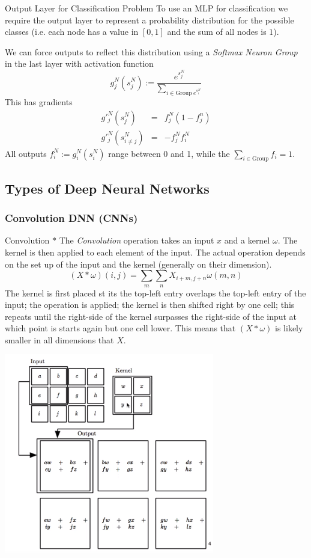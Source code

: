 \documentclass[11pt,a4paper]{article}
\begin{document}
  \begin{proposition}{Output Layer for Classification Problem}
    To use an MLP for classification we require the output layer to represent a probability distribution for the possible classes (i.e. each node has a value in $[0,1]$ and the sum of all nodes is $1$).
    \par We can force outputs to reflect this distribution using a \textit{Softmax Neuron Group} in the last layer with activation function
    \[ g_j^N(s_j^N):=\frac{e^{s_j^N}}{\sum_{i\in\text{Group}\ e^{s_i^N}}} \]
    This has gradients
    \[\begin{array}{rcl}
      g'_j^N(s_j^N)&=&f_j^N(1-f_j^n)\\
      g'_j^N(s_{i\neq j}^N)&=&-f_j^Nf_i^N
    \end{array}\]
    All outputs $f_i^N:=g_i^N(s_i^N)$ range between 0 and 1, while the $\sum_{i\in\text{Group}}f_i=1$.
  \end{proposition}

\subsection{Types of Deep Neural Networks}

\subsubsection{Convolution DNN (CNNs)}

  \begin{definition}{Convolution $*$}
    The \textit{Convolution} operation takes an input $x$ and a kernel $\omega$. The kernel is then applied to each element of the input. The actual operation depends on the set up of the input and the kernel (generally on their dimension).
    \[ (X*\omega)(i,j)=\sum_m\sum_nX_{i+m,j+n}\omega(m,n) \]
    The kernel is first placed st its the top-left entry overlaps the top-left entry of the input; the operation is applied; the kernel is then shifted right by one cell; this repeats until the right-side of the kernel surpasses the right-side of the input at which point is starts again but one cell lower. This means that $(X*\omega)$ is likely smaller in all dimensions that $X$.
    \begin{center}
      \includegraphics[width=.35\textwidth]{2dConvolution.PNG}
    \end{center}
  \end{definition}
\end{document}
